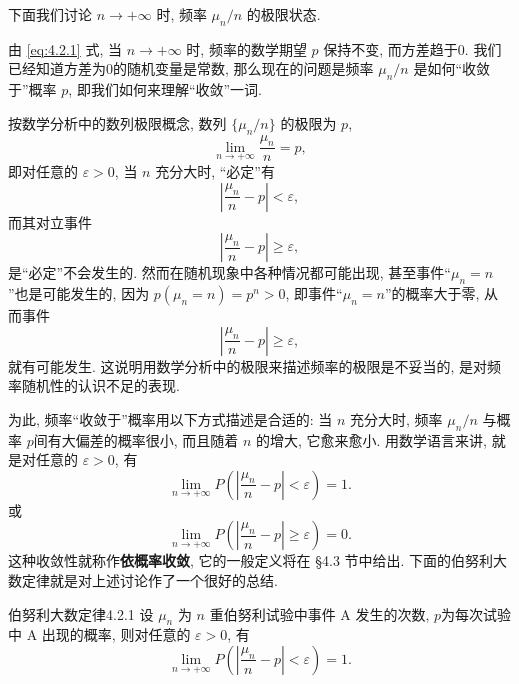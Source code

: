 下面我们讨论 $ n \to +\infty $ 时, 频率 $ \mu_n / n $ 的极限状态.

由 \eqref{eq:4.2.1} 式, 当 $ n \to +\infty $  时, 频率的数学期望 $ p $ 保持不变, 而方差趋于0.
我们已经知道方差为0的随机变量是常数, 那么现在的问题是频率 $ \mu_n / n $ 是如何``收敛于''概率 $ p $, 即我们如何来理解``收敛''一词.

按数学分析中的数列极限概念, 数列 $ \{ \mu_n / n \} $ 的极限为 $ p $,
\begin{equation*}
    \lim_{n \to +\infty} \frac{\mu_n}{n} = p,
\end{equation*}
即对任意的 $ \varepsilon > 0 $, 当 $ n $ 充分大时, ``必定''有
\begin{equation*}
    \left\lvert \frac{\mu_n}{n} - p \right\rvert < \varepsilon,
\end{equation*}
而其对立事件
\begin{equation*}
    \left\lvert \frac{\mu_n}{n} - p \right\rvert \geq \varepsilon,
\end{equation*}
是``必定''不会发生的.
然而在随机现象中各种情况都可能出现, 甚至事件``$ \mu_n = n $''也是可能发生的, 因为 $ p ( \mu_n = n )=p^n > 0 $, 即事件``$ \mu_n = n $''的概率大于零, 从而事件
\begin{equation*}
    \left\lvert \frac{\mu_n}{n} - p \right\rvert \geq \varepsilon,
\end{equation*}
就有可能发生.
这说明用数学分析中的极限来描述频率的极限是不妥当的, 是对频率随机性的认识不足的表现.

为此, 频率``收敛于''概率用以下方式描述是合适的: 当 $ n $ 充分大时, 频率 $ \mu_n / n $ 与概率 $ p $间有大偏差的概率很小, 而且随着 $ n $ 的增大, 它愈来愈小.
用数学语言来讲, 就是对任意的 $ \varepsilon > 0 $, 有
\begin{equation}\label{eq:4.2.2}
    \lim_{n \to +\infty} P \left( \left\lvert \frac{\mu_n}{n} - p \right\rvert < \varepsilon \right) = 1.
\end{equation}
或
\begin{equation}\label{eq:4.2.3}
    \lim_{n \to +\infty} P \left( \left\lvert \frac{\mu_n}{n} - p \right\rvert \geq \varepsilon \right) = 0.
\end{equation}
这种收敛性就称作\textbf{依概率收敛}, 它的一般定义将在 \S 4.3 节中给出.
下面的伯努利大数定律就是对上述讨论作了一个很好的总结.
\begin{theorem}{伯努利大数定律}{4.2.1}
    设 $ \mu_n $ 为 $ n $ 重伯努利试验中事件 A 发生的次数, $ p $为每次试验中 A 出现的概率, 则对任意的 $ \varepsilon > 0 $, 有
    \begin{equation*}
        \lim_{n \to +\infty} P \left( \left\lvert \frac{\mu_n}{n} - p \right\rvert < \varepsilon \right) = 1.
    \end{equation*}
\end{theorem}

